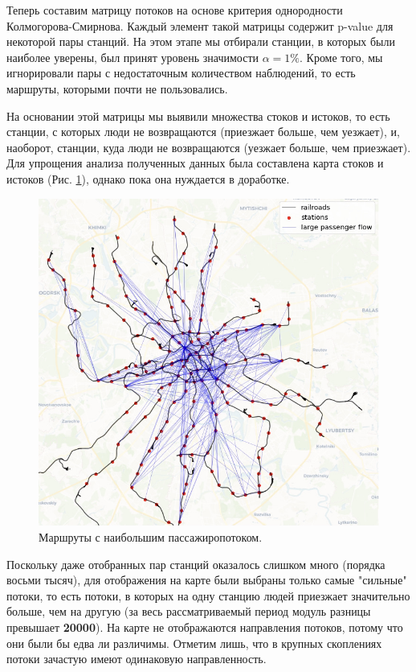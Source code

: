 \documentclass[12pt, fleqn, titlepage]{article}
\begin{document}
    Теперь составим матрицу потоков на основе критерия однородности Колмогорова-Смирнова. Каждый элемент такой матрицы 
    содержит p-value для некоторой пары станций. На этом этапе мы отбирали станции, в которых были наиболее уверены, 
    был принят уровень значимости $\alpha = 1\%$. Кроме того, мы игнорировали пары с недостаточным количеством наблюдений, 
    то есть маршруты, которыми почти не пользовались.

    На основании этой матрицы мы выявили множества стоков и истоков, то есть станции, с которых люди не возвращаются (приезжает 
    больше, чем уезжает), и, наоборот, станции, куда люди не возвращаются (уезжает больше, чем приезжает). Для упрощения 
    анализа полученных данных была составлена карта стоков и истоков (Рис. \ref{large_flow}), однако пока она нуждается в доработке. 

    \begin{figure}[ht]
        \centering
        \includegraphics[scale=0.5]{pics/large_flow.png}
        \caption{Маршруты с наибольшим пассажиропотоком.}
        \label{large_flow}
    \end{figure}

    Поскольку даже отобранных пар станций оказалось слишком много (порядка восьми тысяч), для отображения на карте были выбраны только 
    самые "сильные" потоки, то есть потоки, в которых на одну станцию людей приезжает значительно больше, чем на другую (за весь рассматриваемый 
    период модуль разницы превышает \textbf{20000}). На карте не отображаются направления потоков, потому что они были бы едва ли различимы. 
    Отметим лишь, что в крупных скоплениях потоки зачастую имеют одинаковую направленность.
\end{document}
